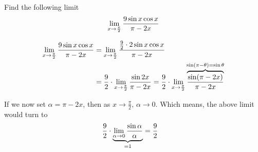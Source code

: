 


\question Find the following limit \[\lim_{x\to\frac{\pi}{2}}\dfrac{9 \sin x\cos x}{\pi - 2x}\]

\watchout[-40pt]

\ifprintanswers
\fi 

\begin{solution}
  \begin{align}
    \lim_{x\to\frac{\pi}{2}}\dfrac{9 \sin x\cos x}{\pi - 2x} &=
    \lim_{x\to\frac{\pi}{2}}\dfrac{\frac{9}{2}\cdot 2\sin x\cos x}{\pi - 2x} \\
    &= \dfrac{9}{2}\cdot\lim_{x\to\frac{\pi}{2}}\dfrac{\sin 2x}{\pi-2x} =
    \dfrac{9}{2}\cdot\lim_{x\to\frac{\pi}{2}}\overbrace{\dfrac{\sin (\pi-2x)}{\pi-2x}}^{\sin(\pi-\theta) = \sin\theta}
  \end{align}
  
  If we now set $\alpha = \pi - 2x$, then as $x\to\frac\pi{2},\, \alpha\to 0$. Which means, 
  the above limit would turn to 
  \begin{align}
    &\dfrac{9}{2}\cdot\underbrace{\lim_{\alpha\to 0}\dfrac{\sin\alpha}{\alpha}}
    _{= 1} = \dfrac{9}{2}
  \end{align}
\end{solution}
